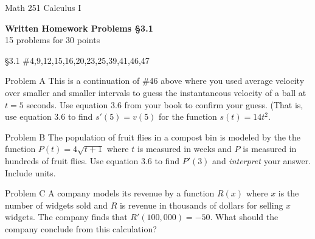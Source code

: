 \documentclass[11pt]{report}
\theoremstyle{plain}
\begin{document}
\hfill Math 251 Calculus I
\begin{center}
\Large{\textbf{Written Homework Problems \S 3.1}} \\
15 problems for 30 points\\
\end{center}

\begin{description}
\item{\S 3.1} \#4,9,12,15,16,20,23,25,39,41,46,47

\item{Problem A} This is a continuation of \#46 above where you used average velocity over smaller and smaller intervals to guess the instantaneous velocity of a ball at $t=5$ seconds. Use equation 3.6 from your book to confirm your guess. (That is, use equation 3.6 to find $s'(5)=v(5)$ for the function $s(t)=14t^2.$

\item{Problem B} The population of fruit flies in a compost bin is modeled by the the function $P(t)=4\sqrt{t+1}$ where $t$ is measured in weeks and $P$ is measured in hundreds of fruit flies. Use equation 3.6 to find $P'(3)$ and \emph{interpret} your answer. Include units.

\item{Problem C} A company models its revenue by a function $R(x)$ where $x$ is the number of widgets sold and $R$ is revenue in thousands of dollars for selling $x$ widgets. The company finds that $R'(100,000)=-50.$ What should the company conclude from this calculation?


\end{description}
\end{document}
